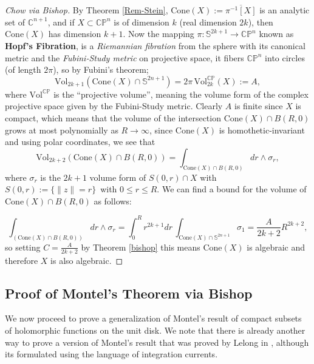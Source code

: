 \documentclass[12pt,twoside,a4paper]{report}
\newcommand{\co}{\ensuremath{\mathbb C }}
\newcommand{\cp}{\ensuremath{\mathbb{CP}}}
\newcommand{\sph}{\ensuremath{\mathbb S }}
\begin{document}
  \begin{proof}[Chow via Bishop] By Theorem \ref{Rem-Stein}, $\textrm{Cone}(X):=\overline{\pi^{-1}[X]}$
              is an analytic set of $\co^{n+1}$, and if $X\subset\cp^n$ is of dimension $k$ (real dimension $2k$), then
              $\textrm{Cone}(X)$ has dimension $k+1$. Now the mapping
              $\pi:\sph^{2k+1}\rightarrow\cp^n$ known as \textbf{Hopf's Fibration}, is a \emph{Riemannian fibration} from the sphere with its canonical metric and the \emph{Fubini-Study metric} on projective space, it fibers
              $\cp^n$ into circles (of length $2\pi$), so by Fubini's theorem;
              \[
                  \textrm{Vol}_{2k+1}(\textrm{Cone}(X)\cap\sph^{2n+1})= 2\pi\,\textrm{Vol}^{\cp}_{2k}(X):=A,
              \]
              \noindent where $\textrm{Vol}^{\cp}$ is the ``projective volume'',
              meaning the volume form of the complex projective space given by the Fubini-Study metric.
              Clearly $A$ is finite since $X$ is compact, which means that the volume of the
              intersection $\textrm{Cone}(X)\cap B(R,0)$ grows at most polynomially as
              $R\rightarrow\infty$, since $\textrm{Cone}(X)$ is homothetic-invariant and using
              polar coordinates, we see that
      \[
      \textrm{Vol}_{2k+2}(\textrm{Cone}(X)\cap B(R,0))= \int_{\textrm{Cone}(X)\cap B(R,0)}dr\wedge\sigma_r,
      \]
      \noindent where $\sigma_r$ is the $2k+1$ volume form of
      $S(0,r)\cap{X}$  with
      $S(0,r):=\lbrace\| z\|=r\rbrace\,$ with $0\leq{r}\leq{R}$. We can find a bound for the volume of $\textrm{Cone}(X)\cap B(R,0)$ as follows:

      \[
          \int_{(\textrm{Cone}(X)\cap B(R,0))}dr\wedge\sigma_r=
          \int^R_0 r^{2k+1}dr\,\int_{\textrm{Cone}(X)\cap\sph^{2n+1}}\sigma_1=
          \frac{A}{2k+2}R^{2k+2},
      \]
      \noindent so setting $C=\frac{A}{2k+2}$ by Theorem \ref{bishop} this means
      $\textrm{Cone}(X)$ is algebraic and therefore $X$ is also algebraic.
      \end{proof}

  \subsection{Proof of Montel's Theorem via Bishop}
  We now proceed to prove a generalization of Montel's result of compact subsets of holomorphic functions on the unit disk. We note that there is already another way to prove a version of Montel's result that was proved by Lelong in \cite{Lelong}, although its formulated using the language of integration currents.
\end{document}

